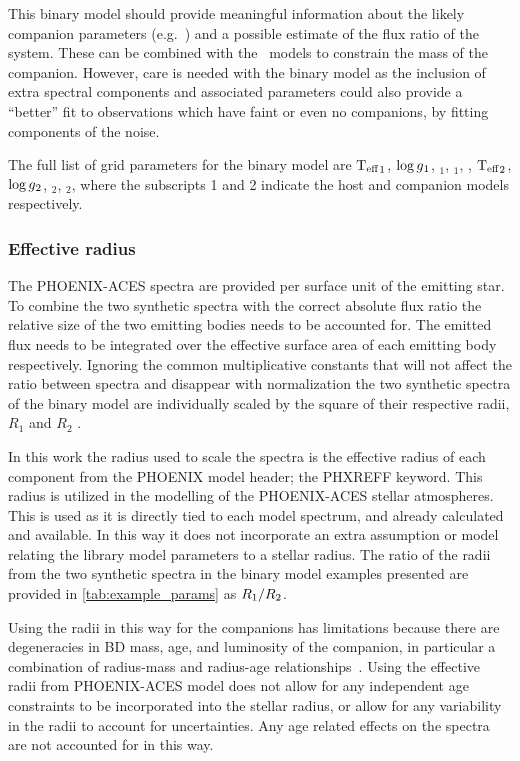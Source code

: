 This binary model should provide meaningful information about the likely companion parameters (e.g.\ \Teff{}) and a possible estimate of the flux ratio of the system.
These can be combined with the~\citet{baraffe_evolutionary_2003} models to constrain the mass of the companion.
However, care is needed with the binary model as the inclusion of extra spectral components and associated parameters could also provide a ``better'' fit to observations which have faint or even no companions, by fitting components of the noise.

The full list of grid parameters for the binary model are \({\textrm{T}_{\mathrm{eff}}}_{1}\), \(\log{g}{}_{1}\), \feh{}\(_{1}\), \alphafe{}\(_{1}\), \Rvone{}, \({\textrm{T}_{\mathrm{eff}}}_{2}\), \(\log{g}{}_{2}\), \feh{}\(_{2}\), \alphafe{}\(_{2}\), \Rvtwo{} where the subscripts 1 and 2 indicate the host and companion models respectively.


\subsubsection{Effective radius}
\label{subsubsec:effective_radius}

The {PHOENIX-ACES} spectra are provided per surface unit of the emitting star.
To combine the two synthetic spectra with the correct absolute flux ratio the relative size of the two emitting bodies needs to be accounted for.
The emitted flux needs to be integrated over the effective surface area of each emitting body respectively.
Ignoring the common multiplicative constants that will not affect the ratio between spectra and disappear with normalization the two synthetic spectra of the binary model are individually scaled by the square of their respective radii, \(R_{1}\) and \(R_{2}\) \Rone{}.

In this work the radius used to scale the spectra is the effective radius of each component from the {PHOENIX} model header; the {PHXREFF} keyword.
This radius is utilized in the modelling of the {PHOENIX-ACES} stellar atmospheres.
This is used as it is directly tied to each model spectrum, and already calculated and available.
In this way it does not incorporate an extra assumption or model relating the library model parameters to a stellar radius.
The ratio of the radii from the two synthetic spectra in the binary model examples presented are provided in \cref{tab:example_params} as \({R}_{1}/{R}_{2}\).

Using the radii in this way for the companions has limitations because there are degeneracies in {BD} mass, age, and luminosity of the companion, in particular a combination of radius-mass and radius-age relationships~\citep{sorahana_radii_2013}.
Using the effective radii from {PHOENIX-ACES} model does not allow for any independent age constraints to be incorporated into the stellar radius, or allow for any variability in the radii to account for uncertainties.
Any age related effects on the spectra are not accounted for in this way.

